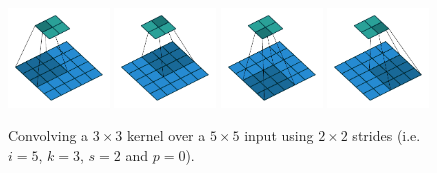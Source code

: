 \documentclass{report}
\begin{document}
\begin{figure}[p]
    \centering
    \includegraphics[width=0.24\textwidth]{pdf/no_padding_strides_00.pdf}
    \includegraphics[width=0.24\textwidth]{pdf/no_padding_strides_01.pdf}
    \includegraphics[width=0.24\textwidth]{pdf/no_padding_strides_02.pdf}
    \includegraphics[width=0.24\textwidth]{pdf/no_padding_strides_03.pdf}
    \caption{\label{fig:no_padding_strides} Convolving a $3 \times 3$
        kernel over a $5 \times 5$ input using $2 \times 2$ strides (i.e.
        $i = 5$, $k = 3$, $s = 2$ and $p = 0$).}
\end{figure}
\end{document}
